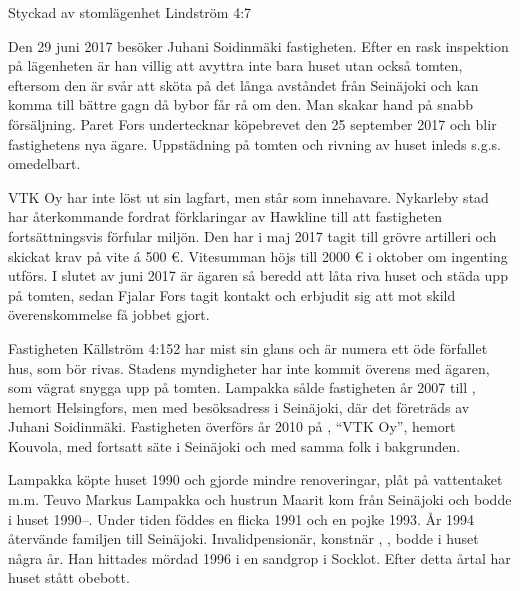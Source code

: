 %

Styckad av stomlägenhet Lindström 4:7

%
Den 29 juni 2017 besöker Juhani Soidinmäki fastigheten. Efter en rask inspektion på lägenheten är han villig att avyttra inte bara huset utan också tomten, eftersom den är svår att sköta på det långa avståndet från Seinäjoki och kan komma till bättre gagn då bybor får rå om den. Man skakar hand på snabb försäljning. Paret Fors undertecknar köpebrevet den 25 september 2017 och blir fastighetens nya ägare. Uppstädning på tomten och rivning av huset inleds s.g.s. omedelbart.



%
VTK Oy har inte löst ut sin lagfart, men står som innehavare. Nykarleby stad har återkommande fordrat förklaringar av Hawkline till att fastigheten fortsättningsvis förfular miljön. Den har i maj 2017 tagit till grövre artilleri och skickat krav på vite á 500 €. Vitesumman höjs till 2000 € i oktober om ingenting utförs. I slutet av juni 2017 är ägaren så beredd att låta riva huset och städa upp på tomten, sedan Fjalar Fors tagit kontakt och erbjudit sig att mot skild överenskommelse få jobbet gjort.


%
Fastigheten Källström 4:152 har mist sin glans och är numera ett öde förfallet hus, som bör rivas. Stadens myndigheter har inte kommit överens med ägaren, som vägrat snygga upp på tomten. Lampakka sålde fastigheten år 2007 till , hemort Helsingfors, men med besöksadress i Seinäjoki, där det företräds av Juhani Soidinmäki. Fastigheten överförs år 2010 på , ``VTK Oy'', hemort Kouvola, med fortsatt säte i Seinäjoki och med samma folk i bakgrunden.


%
Lampakka köpte huset 1990 och gjorde mindre renoveringar, plåt på vattentaket m.m. Teuvo Markus Lampakka och hustrun Maarit kom från Seinäjoki och bodde i huset 1990--. Under tiden föddes en flicka 1991 och en pojke 1993. År 1994 återvände familjen till Seinäjoki. Invalidpensionär, konstnär , , bodde i huset några år. Han hittades mördad 1996 i en sandgrop i Socklot. Efter detta årtal har huset stått obebott.


